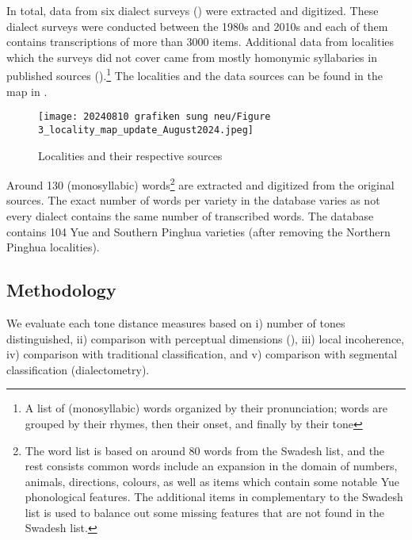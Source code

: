 \documentclass[output=paper, chinesefont]{langscibook}
\begin{document}
In total, data from six dialect surveys (\citealt{ZhanCheung1987, ZhanCheung1994, ZhanCheung1998, Shao2016, Xie2007, ChenLin2009, ChenLiu2009}) were extracted and digitized. These dialect surveys were conducted between the 1980s and 2010s and each of them contains transcriptions of more than 3000 items. Additional data from localities which the surveys did not cover came from mostly homonymic syllabaries in published sources (\citealt{Liu2015, Zhong2015, Huang2006, Chen2009, Yang2013, Tan2017, Shi2009, ChenWeng2010}).\footnote{A list of (monosyllabic) words organized by their pronunciation; words are grouped by their rhymes, then their onset, and finally by their tone} The localities and the data sources can be found in the map in .

  
\begin{figure}
\caption{Localities and their respective sources}
\label{fig:sung:3}
\texttt{[image: 20240810 grafiken sung neu/Figure 3\_locality\_map\_update\_August2024.jpeg]}
\end{figure}

Around 130 (monosyllabic) words\footnote{The word list is based on around 80 words from the Swadesh list, and the rest consists common words include an expansion in the domain of numbers, animals, directions, colours, as well as items which contain some notable Yue phonological features. The additional items in complementary to the Swadesh list is used to balance out some missing features that are not found in the Swadesh list.} are extracted and digitized from the original sources. The exact number of words per variety in the database varies as not every dialect contains the same number of transcribed words. The database contains 104 Yue and Southern Pinghua varieties (after removing the Northern Pinghua localities).

\subsection{Methodology}
\label{sec:sung:4.2}
We evaluate each tone distance measures based on i) number of tones distinguished, ii) comparison with perceptual dimensions (\citealt{GandourHarshman1978}), iii) local incoherence, iv) comparison with traditional classification, and v) comparison with segmental classification (dialectometry).
\end{document}
